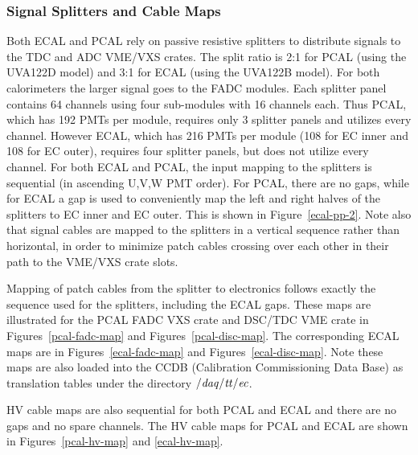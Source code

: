 \documentclass[letterpaper,10pt]{article}
\begin{document}
\subsubsection{Signal Splitters and Cable Maps}
\label{hv-layout}

Both ECAL and PCAL rely on passive resistive splitters to distribute signals to the TDC and ADC
VME/VXS crates.  The split ratio is 2:1 for PCAL (using the UVA122D model)  and 3:1 for ECAL
(using the UVA122B model).  For both calorimeters the larger signal goes to the FADC modules.
Each splitter panel contains 64 channels using four sub-modules with 16 channels each.  Thus PCAL,
which has 192 PMTs per module, requires only 3 splitter panels and utilizes every channel. However ECAL,
which has 216 PMTs per module (108 for EC inner and 108 for EC outer), requires four splitter panels,
but does not utilize every channel.  For both ECAL and PCAL, the input mapping to the splitters
is sequential (in ascending U,V,W PMT order).  For PCAL, there are no gaps, while for ECAL a gap
is used to conveniently map the left and right halves of the splitters to EC inner and EC outer.  This
is shown in Figure~\ref{ecal-pp-2}.  Note also that signal cables are mapped to the splitters in a
vertical sequence rather than horizontal, in order to minimize patch cables crossing over each other
in their path to the VME/VXS crate slots.

Mapping of patch cables from the splitter to electronics follows exactly the sequence used for the
splitters, including the ECAL gaps.  These maps are illustrated for the PCAL FADC VXS crate and DSC/TDC VME crate in
Figures~\ref{pcal-fadc-map} and Figures~\ref{pcal-disc-map}.  The corresponding ECAL maps are in
Figures~\ref{ecal-fadc-map} and Figures~\ref{ecal-disc-map}.  Note these maps are also loaded into
the CCDB (Calibration Commissioning Data Base) as translation tables  under the directory $\it{/daq/tt/ec}$.

HV cable maps are also sequential for both PCAL and ECAL and there are no gaps and no spare channels.
The HV cable maps for PCAL and ECAL are shown in Figures~\ref{pcal-hv-map} and \ref{ecal-hv-map}.
\end{document}
